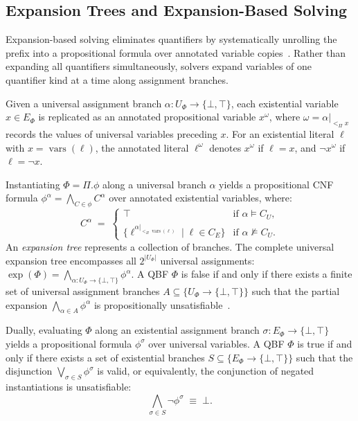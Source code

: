 \documentclass[runningheads]{llncs}
\DeclareMathOperator{\vars}{vars}
\DeclareMathOperator{\expn}{exp}
\newcommand{\Bool}{\{\bot,\top\}}
\begin{document}
\subsection{Expansion Trees and Expansion-Based Solving}
\label{subsec:expansion}

Expansion-based solving eliminates quantifiers by systematically unrolling the prefix into a propositional formula over annotated variable copies~\cite{rareqs, ijtihad, janota2015}.
Rather than expanding all quantifiers simultaneously, solvers expand variables of one quantifier kind at a time along assignment branches.

Given a universal assignment branch $\alpha : U_\Phi \to \Bool$, each existential variable $x \in E_\Phi$ is replicated as an annotated propositional variable $x^\omega$, where $\omega = \alpha|_{<_\Pi x}$ records the values of universal variables preceding $x$.
For an existential literal $\ell$ with $x = \vars(\ell)$, the annotated literal $\ell^\omega$ denotes $x^\omega$ if $\ell = x$, and $\neg x^\omega$ if $\ell = \neg x$.

Instantiating $\Phi = \Pi.\phi$ along a universal branch $\alpha$ yields a propositional CNF formula $\phi^\alpha = \bigwedge_{C \in \phi} C^\alpha$ over annotated existential variables, where:
\begin{equation}
    C^\alpha \;=\;
    \begin{cases}
        \top                                                     & \text{if } \alpha \models C_U,      \\[2pt]
        \{\ell^{\alpha|_{<_\Pi \vars(\ell)}} \mid \ell \in C_E\} & \text{if } \alpha \not\models C_U .
    \end{cases}
\end{equation}
An \emph{expansion tree} represents a collection of branches.
The complete universal expansion tree encompasses all $2^{|U_\Phi|}$ universal assignments: $\expn(\Phi) = \bigwedge_{\alpha : U_\Phi \to \Bool} \phi^\alpha$.
A QBF $\Phi$ is false if and only if there exists a finite set of universal assignment branches $A \subseteq \{U_\Phi \to \Bool\}$ such that the partial expansion $\bigwedge_{\alpha \in A} \phi^\alpha$ is propositionally unsatisfiable~\cite{rareqs, ijtihad}.

Dually, evaluating $\Phi$ along an existential assignment branch $\sigma : E_\Phi \to \Bool$ yields a propositional formula $\phi^\sigma$ over universal variables.
A QBF $\Phi$ is true if and only if there exists a set of existential branches $S \subseteq \{E_\Phi \to \Bool\}$ such that the disjunction $\bigvee_{\sigma \in S} \phi^\sigma$ is valid, or equivalently, the conjunction of negated instantiations is unsatisfiable:
\begin{equation}
    \bigwedge_{\sigma \in S} \neg\phi^\sigma \;\equiv\; \bot .
\end{equation}
\end{document}
